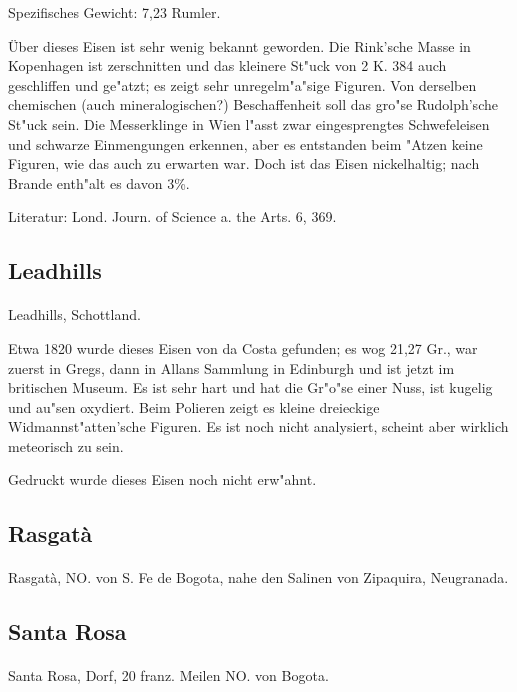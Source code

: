 \documentclass[a4paper, 11pt, oneside]{article}
\begin{document}
Spezifisches Gewicht: 7,23 Rumler.

Über dieses Eisen ist sehr wenig bekannt geworden. Die Rink'sche Masse in Kopenhagen ist zerschnitten und das kleinere St"uck von 2 K. 384 auch geschliffen und ge"atzt; es zeigt sehr unregelm"a"sige Figuren. Von derselben chemischen (auch mineralogischen?) Beschaffenheit soll das gro"se Rudolph'sche St"uck sein. Die Messerklinge in Wien l"asst zwar eingesprengtes Schwefeleisen und schwarze Einmengungen erkennen, aber es entstanden beim "Atzen keine Figuren, wie das auch zu erwarten war. Doch ist das Eisen nickelhaltig; nach Brande enth"alt es davon 3\%.

\footnotesize
Literatur: Lond. Journ. of Science a. the Arts. 6, 369.

\subsection{Leadhills}
\normalsize
\paragraph{}
Leadhills, Schottland.

Etwa 1820 wurde dieses Eisen von da Costa gefunden; es wog 21,27 Gr., war zuerst in Gregs, dann in Allans Sammlung in Edinburgh und ist jetzt im britischen Museum. Es ist sehr hart und hat die Gr"o"se einer Nuss, ist kugelig und au"sen oxydiert. Beim Polieren zeigt es kleine dreieckige Widmannst"atten'sche Figuren. Es ist noch nicht analysiert, scheint aber wirklich meteorisch zu sein.

Gedruckt wurde dieses Eisen noch nicht erw"ahnt.
\subsection{Rasgatà}
\paragraph{}
Rasgatà, NO. von S. Fe de Bogota, nahe den Salinen von Zipaquira, Neugranada.

\subsection{Santa Rosa}
\paragraph{}
Santa Rosa, Dorf, 20 franz. Meilen NO. von Bogota.
\end{document}
